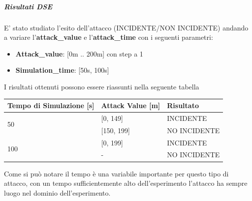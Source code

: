 \subparagraph{Risultati DSE}
E' stato studiato l'esito dell'attacco (INCIDENTE/NON INCIDENTE) andando a variare l'\textbf{attack\_value} e l'\textbf{attack\_time} con i seguenti parametri:
\begin{itemize}
	\item \textbf{Attack\_value}: [0m .. 200m] con step a 1
	\item \textbf{Simulation\_time}: [50s, 100s]
\end{itemize}
 
 I risultati ottenuti possono essere riassunti nella seguente tabella
 
\renewcommand{\arraystretch}{2}
\begin{center}
	\begin{tabular}{ |p{6cm}|p{3cm}|p{4cm}|  }
		\hline
		Tempo di Simulazione [s]& Attack Value [m] & Risultato \\
		\hline
		\multirow{2}{4em}{50} & [0, 149] & INCIDENTE \\
		\cline{2-3}
		& [150, 199] & NO INCIDENTE \\
		\hline
		\multirow{2}{4em}{100} & [0, 199] & INCIDENTE \\
		\cline{2-3}
		& - & NO INCIDENTE \\
		\hline
	\end{tabular}
\end{center}
Come si può notare il tempo è una variabile importante per questo tipo di attacco, con un tempo sufficientemente alto dell'esperimento l'attacco ha sempre luogo nel dominio dell'esperimento.

